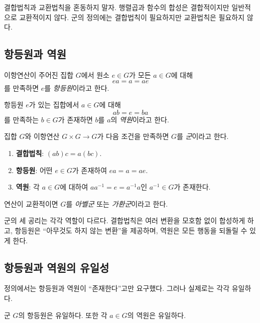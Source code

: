 \begin{pitfall}
결합법칙과 교환법칙을 혼동하지 말자. 행렬곱과 함수의 합성은 결합적이지만 일반적으로 교환적이지 않다. 군의 정의에는 결합법칙이 필요하지만 교환법칙은 필요하지 않다.
\end{pitfall}

\subsection{항등원과 역원}

\begin{definition}[항등원]
이항연산이 주어진 집합 $G$에서 원소 $e\in G$가 모든 $a\in G$에 대해
\[
  ea=a=ae
\]
를 만족하면 $e$를 \emph{항등원}이라고 한다.
\end{definition}

\begin{definition}[역원]
항등원 $e$가 있는 집합에서 $a\in G$에 대해
\[
  ab=e=ba
\]
를 만족하는 $b\in G$가 존재하면 $b$를 $a$의 \emph{역원}이라고 한다.
\end{definition}

\begin{definition}[군]
집합 $G$와 이항연산 $G\times G\to G$가 다음 조건을 만족하면 $G$를 \emph{군}이라고 한다.
\begin{enumerate}[label=(G\arabic*)]
  \item \textbf{결합법칙}: $(ab)c=a(bc)$.
  \item \textbf{항등원}: 어떤 $e\in G$가 존재하여 $ea=a=ae$.
  \item \textbf{역원}: 각 $a\in G$에 대하여 $aa^{-1}=e=a^{-1}a$인 $a^{-1}\in G$가 존재한다.
\end{enumerate}
연산이 교환적이면 $G$를 \emph{아벨군} 또는 \emph{가환군}이라고 한다.
\end{definition}

군의 세 공리는 각각 역할이 다르다. 결합법칙은 여러 변환을 모호함 없이 합성하게 하고, 항등원은 ``아무것도 하지 않는 변환''을 제공하며, 역원은 모든 행동을 되돌릴 수 있게 한다.

\subsection{항등원과 역원의 유일성}

정의에서는 항등원과 역원이 ``존재한다''고만 요구했다. 그러나 실제로는 각각 유일하다.

\begin{proposition}
군 $G$의 항등원은 유일하다. 또한 각 $a\in G$의 역원은 유일하다.
\end{proposition}

